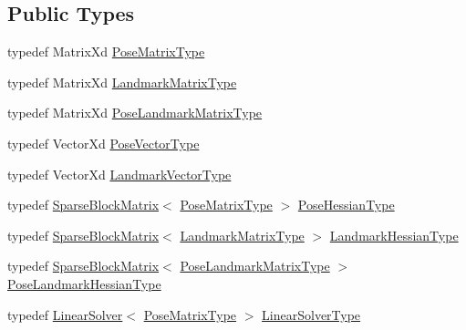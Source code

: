 \subsection*{Public Types}
\begin{DoxyCompactItemize}
\item 
typedef Matrix\+Xd \mbox{\hyperlink{structg2o_1_1_block_solver_traits_3_01_eigen_1_1_dynamic_00_01_eigen_1_1_dynamic_01_4_a11131d4b2d25cea90eef0d3687eb6dc1}{Pose\+Matrix\+Type}}
\item 
typedef Matrix\+Xd \mbox{\hyperlink{structg2o_1_1_block_solver_traits_3_01_eigen_1_1_dynamic_00_01_eigen_1_1_dynamic_01_4_a4409de5074b3458f33ba2015e2fa6891}{Landmark\+Matrix\+Type}}
\item 
typedef Matrix\+Xd \mbox{\hyperlink{structg2o_1_1_block_solver_traits_3_01_eigen_1_1_dynamic_00_01_eigen_1_1_dynamic_01_4_ab81ac9673971ec5c896f4b431ae30f0b}{Pose\+Landmark\+Matrix\+Type}}
\item 
typedef Vector\+Xd \mbox{\hyperlink{structg2o_1_1_block_solver_traits_3_01_eigen_1_1_dynamic_00_01_eigen_1_1_dynamic_01_4_ae8ae50131f5aeaf97c844e20960ebaf3}{Pose\+Vector\+Type}}
\item 
typedef Vector\+Xd \mbox{\hyperlink{structg2o_1_1_block_solver_traits_3_01_eigen_1_1_dynamic_00_01_eigen_1_1_dynamic_01_4_aaff14917064b8670c918e571fcdc4666}{Landmark\+Vector\+Type}}
\item 
typedef \mbox{\hyperlink{classg2o_1_1_sparse_block_matrix}{Sparse\+Block\+Matrix}}$<$ \mbox{\hyperlink{structg2o_1_1_block_solver_traits_3_01_eigen_1_1_dynamic_00_01_eigen_1_1_dynamic_01_4_a11131d4b2d25cea90eef0d3687eb6dc1}{Pose\+Matrix\+Type}} $>$ \mbox{\hyperlink{structg2o_1_1_block_solver_traits_3_01_eigen_1_1_dynamic_00_01_eigen_1_1_dynamic_01_4_a380bde2a88f9b257142dd3419422e5a3}{Pose\+Hessian\+Type}}
\item 
typedef \mbox{\hyperlink{classg2o_1_1_sparse_block_matrix}{Sparse\+Block\+Matrix}}$<$ \mbox{\hyperlink{structg2o_1_1_block_solver_traits_3_01_eigen_1_1_dynamic_00_01_eigen_1_1_dynamic_01_4_a4409de5074b3458f33ba2015e2fa6891}{Landmark\+Matrix\+Type}} $>$ \mbox{\hyperlink{structg2o_1_1_block_solver_traits_3_01_eigen_1_1_dynamic_00_01_eigen_1_1_dynamic_01_4_a73a81a0aeabd1216ae3a8f5700666ac4}{Landmark\+Hessian\+Type}}
\item 
typedef \mbox{\hyperlink{classg2o_1_1_sparse_block_matrix}{Sparse\+Block\+Matrix}}$<$ \mbox{\hyperlink{structg2o_1_1_block_solver_traits_3_01_eigen_1_1_dynamic_00_01_eigen_1_1_dynamic_01_4_ab81ac9673971ec5c896f4b431ae30f0b}{Pose\+Landmark\+Matrix\+Type}} $>$ \mbox{\hyperlink{structg2o_1_1_block_solver_traits_3_01_eigen_1_1_dynamic_00_01_eigen_1_1_dynamic_01_4_aa6f67fd6ba29156f6d1069db0c3b5d11}{Pose\+Landmark\+Hessian\+Type}}
\item 
typedef \mbox{\hyperlink{classg2o_1_1_linear_solver}{Linear\+Solver}}$<$ \mbox{\hyperlink{structg2o_1_1_block_solver_traits_3_01_eigen_1_1_dynamic_00_01_eigen_1_1_dynamic_01_4_a11131d4b2d25cea90eef0d3687eb6dc1}{Pose\+Matrix\+Type}} $>$ \mbox{\hyperlink{structg2o_1_1_block_solver_traits_3_01_eigen_1_1_dynamic_00_01_eigen_1_1_dynamic_01_4_ad062ca3c21bf3a3e08d5350174d93d6d}{Linear\+Solver\+Type}}
\end{DoxyCompactItemize}
